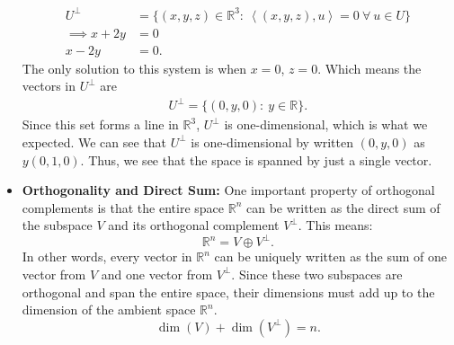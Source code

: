 \documentclass{report}
\begin{document}
\begin{itemize}
            \begin{align*}
                U^{\perp} &= \{(x,y,z) \in \mathbb{R}^{3}:\ \left\langle (x,y,z), u \right\rangle = 0 \ \forall \ u \in U\} \\
                \implies x + 2y &= 0 \\
                x - 2y &= 0
            .\end{align*}
            \bigbreak \noindent 
            The only solution to this system is when $x=0$, $z=0$. Which means the vectors in $U^{\perp}$ are
            \begin{align*}
                U^{\perp} = \{(0,y,0) :\ y \in \mathbb{R}\}
            .\end{align*}
            Since this set forms a line in $\mathbb{R}^{3}$, $U^{\perp}$ is one-dimensional, which is what we expected. We can see that $U^{\perp}$ is one-dimensional by written $(0,y,0)$ as $y(0,1,0)$. Thus, we see that the space is spanned by just a single vector.
        \item \textbf{Orthogonality and Direct Sum:}
            One important property of orthogonal complements is that the entire space 
            \(\mathbb{R}^n\) can be written as the direct sum of the subspace \(V\) and its orthogonal complement \(V^\perp\). This means:
            \[
                \mathbb{R}^n = V \oplus V^\perp.
            \]
            In other words, every vector in \(\mathbb{R}^n\) can be uniquely written as the sum of one vector from \(V\) and one vector from \(V^\perp\).
            \bigbreak \noindent 
            Since these two subspaces are orthogonal and span the entire space, their dimensions must add up to the dimension of the ambient space \(\mathbb{R}^n\).
            \[
                \dim(V) + \dim(V^\perp) = n.
            \]



\end{itemize}
\end{document}
